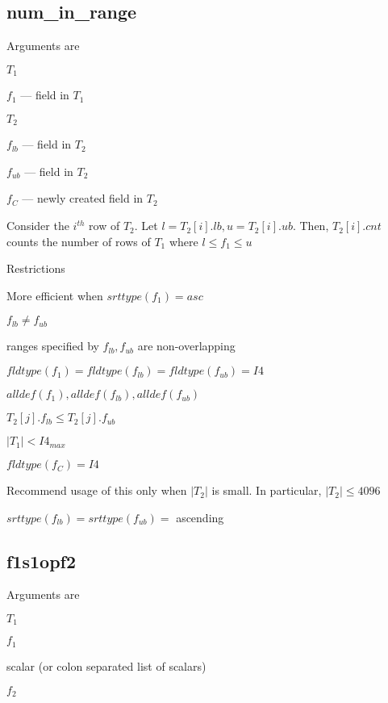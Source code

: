 \documentclass{report}
\begin{document}

\subsection{num\_in\_range}
\label{num_in_range}

Arguments are 
\be
\item \(T_1\)
\item \(f_1\) --- field in \(T_1\)
\item \(T_2\)
\item \(f_{lb}\) --- field in \(T_2\)
\item \(f_{ub}\) --- field in \(T_2\)
\item \(f_C\) --- newly created field in \(T_2\)
\ee

Consider the \(i^{th}\) row of \(T_2\). 
Let \(l = T_2[i].lb, u = T_2[i].ub\). Then, \(T_2[i].cnt\) counts the
number of rows of \(T_1\) where \(l \leq f_1 \leq u\)

Restrictions
\be
\item More efficient when \(srttype(f_1) = asc\)
\item \(f_{lb} \neq f_{ub}\)
\item ranges specified by \(f_{lb},  f_{ub}\) are non-overlapping
\item \(fldtype(f_1) = fldtype(f_{lb}) = fldtype(f_{ub}) = I4\)
\item \(alldef(f_1), alldef(f_{lb}), alldef(f_{ub})\)
\item \(T_2[j].f_{lb} \leq T_2[j].f_{ub}\)
\item \(|T_1| < I4_{max}\)
\item \(fldtype(f_C) = I4\)
\item Recommend usage of this only when \(|T_2|\) is small. In
particular, \(|T_2| \leq 4096\)
\item \(srttype(f_{lb}) = srttype(f_{ub}) = \) ascending
\ee

\subsection{f1s1opf2}
\label{f1s1opf2}

Arguments are 
\be
\item \(T_1\)
\item \(f_1\)
\item scalar (or colon separated list of scalars)
\item \(f_2\)
\ee
\end{document}
